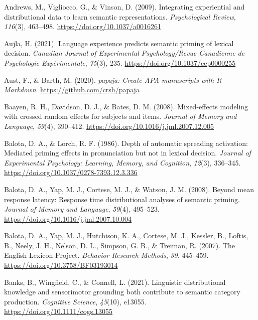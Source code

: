 \documentclass[
  12pt,
  man,floatsintext]{apa7}
\newlength{\cslhangindent}
\newlength{\cslentryspacingunit} %
\newenvironment{CSLReferences}[2] %
 {%
  \setlength{\parindent}{0pt}
  \ifodd #1
  \let\oldpar\par
  \def\par{\hangindent=\cslhangindent\oldpar}
  \fi
  \setlength{\parskip}{#2\cslentryspacingunit}
 }%
 {}
\begin{document}
\begin{CSLReferences}{1}{0}
\leavevmode{}%
Andrews, M., Vigliocco, G., \& Vinson, D. (2009). Integrating experiential and distributional data to learn semantic representations. \emph{Psychological Review}, \emph{116}(3), 463--498. \url{https://doi.org/10.1037/a0016261}

\leavevmode{}%
Aujla, H. (2021). Language experience predicts semantic priming of lexical decision. \emph{Canadian Journal of Experimental Psychology/Revue Canadienne de Psychologie Expérimentale}, \emph{75}(3), 235. \url{https://doi.org/10.1037/cep0000255}

\leavevmode{}%
Aust, F., \& Barth, M. (2020). \emph{{papaja}: {Create} {APA} manuscripts with {R Markdown}}. \url{https://github.com/crsh/papaja}

\leavevmode{}%
Baayen, R. H., Davidson, D. J., \& Bates, D. M. (2008). Mixed-effects modeling with crossed random effects for subjects and items. \emph{Journal of Memory and Language}, \emph{59}(4), 390--412. \url{https://doi.org/10.1016/j.jml.2007.12.005}

\leavevmode{}%
Balota, D. A., \& Lorch, R. F. (1986). Depth of automatic spreading activation: {Mediated} priming effects in pronunciation but not in lexical decision. \emph{Journal of Experimental Psychology: Learning, Memory, and Cognition}, \emph{12}(3), 336--345. \url{https://doi.org/10.1037/0278-7393.12.3.336}

\leavevmode{}%
Balota, D. A., Yap, M. J., Cortese, M. J., \& Watson, J. M. (2008). Beyond mean response latency: {Response} time distributional analyses of semantic priming. \emph{Journal of Memory and Language}, \emph{59}(4), 495--523. \url{https://doi.org/10.1016/j.jml.2007.10.004}

\leavevmode{}%
Balota, D. A., Yap, M. J., Hutchison, K. A., Cortese, M. J., Kessler, B., Loftis, B., Neely, J. H., Nelson, D. L., Simpson, G. B., \& Treiman, R. (2007). The {English Lexicon Project}. \emph{Behavior Research Methods}, \emph{39}, 445--459. \url{https://doi.org/10.3758/BF03193014}

\leavevmode{}%
Banks, B., Wingfield, C., \& Connell, L. (2021). Linguistic distributional knowledge and sensorimotor grounding both contribute to semantic category production. \emph{Cognitive Science}, \emph{45}(10), e13055. \url{https://doi.org/10.1111/cogs.13055}


\end{CSLReferences}
\end{document}
